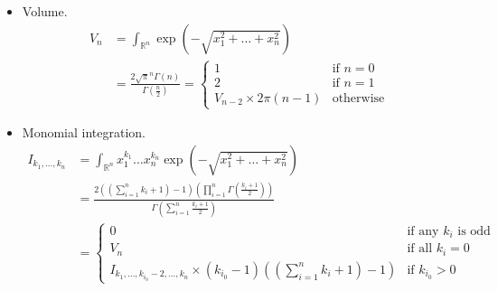 \documentclass[draft]{scrartcl}
\begin{document}
\begin{itemize}
  \item Volume.
\begin{equation*}\label{ndimlaguerre}
  \begin{split}
  V_n
  &= \int_{\mathbb{R}^n} \exp\left(-\sqrt{x_1^2+\dots+x_n^2}\right)\\
  &= \frac{2 \sqrt{\pi}^n \Gamma(n)}{\Gamma(\frac{n}{2})}
  = \begin{cases}
    1&\text{if $n=0$}\\
    2&\text{if $n=1$}\\
    V_{n-2} \times 2\pi(n-1)&\text{otherwise}
  \end{cases}
  \end{split}
\end{equation*}

\item Monomial integration.
\[
  \begin{split}
  I_{k_1,\dots,k_n}
  &= \int_{\mathbb{R}^n} x_1^{k_1}\dots x_n^{k_n} \exp(-\sqrt{x_1^2+\dots+x_n^2})\\
  &= \frac{
    2 \left(\left(\sum_{i=1}^n k_i+1\right) - 1\right)
    \left(\prod_{i=1}^n\Gamma\left(\frac{k_i + 1}{2}\right)\right)
  }{
    \Gamma\left(\sum_{i=1}^n\frac{k_i + 1}{2}\right)
  }\\
  &=\begin{cases}
    0&\text{if any $k_i$ is odd}\\
    V_n&\text{if all $k_i=0$}\\
    I_{k_1,\dots,k_{i_0}-2,\dots,k_n} \times (k_{i_0} - 1) \left(\left(\sum_{i=1}^n
    k_i+1\right) - 1\right)&\text{if $k_{i_0} > 0$}
  \end{cases}
  \end{split}
\]
\end{itemize}
\end{document}
